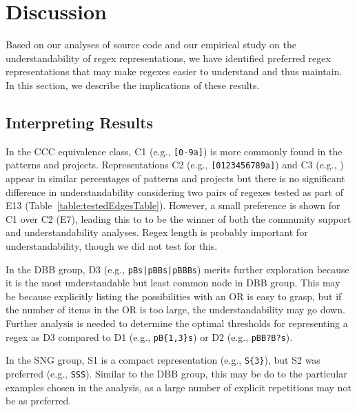 \section{Discussion}
\label{sec:discussion}
Based on our analyses of source code and our empirical study on the understandability of regex representations, we have identified preferred regex representations that may make regexes easier to understand and thus maintain. In this section, we describe the implications of these results. 

\subsection{Interpreting Results}
In the CCC equivalence class, C1 (e.g., \verb![0-9a]!) is more commonly found in the patterns and projects.  Representations C2 (e.g., \verb![0123456789a]!) and C3 (e.g., ) appear in similar percentages of patterns and projects but there is no significant difference in understandability considering two pairs of regexes tested as part of E13 (Table~\ref{table:testedEdgesTable}). However, a small preference is shown for C1 over C2 (E7), leading this to to be the winner of both the community support and understandability analyses.    Regex length is probably important for understandability, though we did not test for this.


In the DBB group, D3 (e.g., \verb!pBs|pBBs|pBBBs!) merits further exploration because it is the most understandable but least common node in DBB group.  This may be because explicitly listing the possibilities with an OR is easy to grasp, but if the number of items in the OR is too large, the understandability may go down. Further analysis is needed to determine the optimal thresholds for representing a regex as D3 compared to D1 (e.g., \verb!pB{1,3}s!) or D2 (e.g., \verb!pBB?B?s!). 

In the SNG group, S1 is a compact representation (e.g., \verb!S{3}!), but S2 was preferred (e.g., \verb!SSS!). Similar to the DBB group, this may be do to the particular examples chosen in the analysis, as a large number of explicit repetitions may not be as preferred. 

